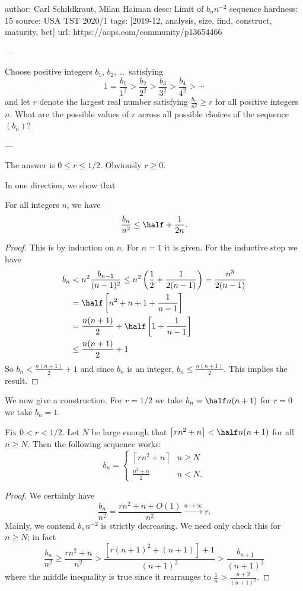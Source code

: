 author: Carl Schildkraut, Milan Haiman
desc: Limit of $b_n n^{-2}$ sequence
hardness: 15
source: USA TST 2020/1
tags: [2019-12, analysis, size, find, construct, maturity, bet]
url: https://aops.com/community/p13654466

---

Choose positive integers $b_1$, $b_2$, \dots\ satisfying
\[ 1 = \frac{b_1}{1^2} > \frac{b_2}{2^2} > \frac{b_3}{3^2} > \frac{b_4}{4^2} > \dotsb \]
and let $r$ denote the largest real number
satisfying $\frac{b_n}{n^2} \ge r$ for all positive integers $n$.
What are the possible values of $r$ across all
possible choices of the sequence $(b_n)$?

---

The answer is $0 \le r \le 1/2$. Obviously $r \ge 0$.

In one direction, we show that
\begin{claim*}
  For all integers $n$, we have
  \[ \frac{b_n}{n^2} \le \half + \frac{1}{2n}. \]
\end{claim*}
\begin{proof}
  This is by induction on $n$. For $n=1$ it is given.
  For the inductive step we have
  \begin{align*}
    b_n &< n^2 \frac{b_{n-1}}{(n-1)^2}
    \le n^2 \left( \frac12 + \frac{1}{2(n-1)}  \right)
    = \frac{n^3}{2(n-1)} \\
    &= \half \left[ n^2+n+1 + \frac{1}{n-1} \right] \\
    &= \frac{n(n+1)}{2} + \half \left[ 1 + \frac{1}{n-1} \right] \\
    &\le \frac{n(n+1)}{2} + 1
  \end{align*}
  So $b_n < \frac{n(n+1)}{2} + 1$
  and since $b_n$ is an integer, $b_n \le \frac{n(n+1)}{2}$.
  This implies the result.
\end{proof}

We now give a construction.
For $r=1/2$ we take $b_n = \half n(n+1)$ for $r=0$ we take $b_n = 1$.

\begin{claim*}
  Fix $0 < r < 1/2$.
  Let $N$ be large enough that $\left\lceil rn^2+n \right\rceil < \half n(n+1)$ for all $n \ge N$.
  Then the following sequence works:
  \[ b_n = \begin{cases}
    \left\lceil rn^2 + n \right\rceil & n \ge N \\
    \frac{n^2+n}{2} & n < N.
  \end{cases} \]
\end{claim*}
\begin{proof}
  We certainly have
  \[ \frac{b_n}{n^2} = \frac{rn^2 + n + O(1)}{n^2} \xrightarrow{n \to \infty} r. \]
  Mainly, we contend $b_n n^{-2}$ is strictly decreasing.
  We need only check this for $n \ge N$; in fact
  \[ \frac{b_n}{n^2} \ge \frac{rn^2+n}{n^2}
    > \frac{[r(n+1)^2+(n+1)]+1}{(n+1)^2}
    > \frac{b_{n+1}}{(n+1)^2} \]
  where the middle inequality is true
  since it rearranges to $\frac1n > \frac{n+2}{(n+1)^2}$.
\end{proof}
